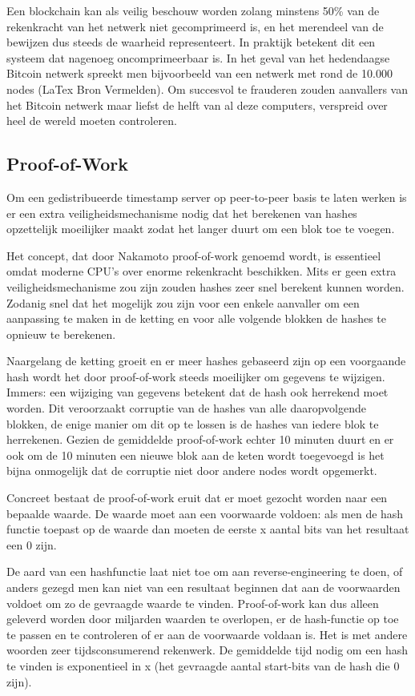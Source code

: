 	Een blockchain kan als veilig beschouw worden zolang minstens 50\% van de rekenkracht van het netwerk niet gecomprimeerd is, en het merendeel van de bewijzen dus steeds de waarheid representeert. In praktijk betekent dit een systeem dat nagenoeg oncomprimeerbaar is. In het geval van het hedendaagse Bitcoin netwerk spreekt men bijvoorbeeld van een netwerk met rond de 10.000 nodes (LaTex Bron Vermelden). Om succesvol te frauderen zouden aanvallers van het Bitcoin netwerk maar liefst de helft van al deze computers, verspreid over heel de wereld moeten controleren. 
			
	\subsection{Proof-of-Work}
	Om een gedistribueerde timestamp server op peer-to-peer basis te laten werken is er een extra veiligheidsmechanisme nodig dat het berekenen van hashes opzettelijk moeilijker maakt zodat het langer duurt om een blok toe te voegen. 
	
	Het concept, dat door Nakamoto proof-of-work genoemd wordt, is essentieel omdat moderne CPU’s over enorme rekenkracht beschikken. Mits er geen extra veiligheidsmechanisme zou zijn zouden hashes zeer snel berekent kunnen worden. Zodanig snel dat het mogelijk zou zijn voor een enkele aanvaller om een aanpassing te maken in de ketting en voor alle volgende blokken de hashes te opnieuw te berekenen. 
	
	Naargelang de ketting groeit en er meer hashes gebaseerd zijn op een voorgaande hash wordt het door proof-of-work steeds moeilijker om gegevens te wijzigen. Immers: een wijziging van gegevens betekent dat de hash ook herrekend moet worden. Dit veroorzaakt corruptie van de hashes van alle daaropvolgende blokken, de enige manier om dit op te lossen is de hashes van iedere blok te herrekenen. 
	Gezien de gemiddelde proof-of-work echter 10 minuten duurt en er ook om de 10 minuten een nieuwe blok aan de keten wordt toegevoegd is het bijna onmogelijk dat de corruptie niet door andere nodes wordt opgemerkt.
	
	Concreet bestaat de proof-of-work eruit dat er moet gezocht worden naar een bepaalde waarde. De waarde moet aan een voorwaarde voldoen: als men de hash functie toepast op de waarde dan moeten de eerste x aantal bits van het resultaat een 0 zijn. 
	
	De aard van een hashfunctie laat niet toe om aan reverse-engineering te doen, of anders gezegd men kan niet van een resultaat beginnen dat aan de voorwaarden voldoet om zo de gevraagde waarde te vinden. Proof-of-work kan dus alleen geleverd worden door miljarden waarden te overlopen, er de hash-functie op toe te passen en te controleren of er aan de voorwaarde voldaan is. Het is met andere woorden zeer tijdsconsumerend rekenwerk. De gemiddelde tijd nodig om een hash te vinden is exponentieel in x (het gevraagde aantal start-bits van de hash die 0 zijn).
	
